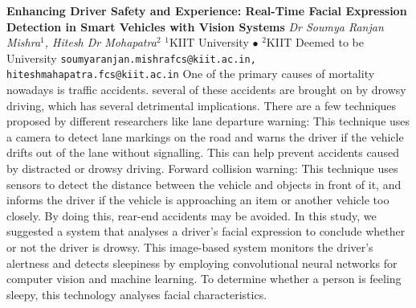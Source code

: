 
    \begin{conf-abstract}[]
        {\textbf{Enhancing Driver Safety and Experience: Real-Time Facial Expression Detection in Smart Vehicles with Vision Systems}}
        {\textit{Dr Soumya Ranjan Mishra$^{1}$, Hitesh Dr Mohapatra$^{2}$}}
        {$^{1}$KIIT University $\bullet$ $^{2}$KIIT Deemed to be University}
        {\texttt{soumyaranjan.mishrafcs@kiit.ac.in, hiteshmahapatra.fcs@kiit.ac.in}}
        {One of the primary causes of mortality nowadays is traffic accidents. several of these accidents are brought on by drowsy driving, which has several detrimental implications. There are a few techniques proposed by different researchers like lane departure warning: This technique uses a camera to detect lane markings on the road and warns the driver if the vehicle drifts out of the lane without signalling. This can help prevent accidents caused by distracted or drowsy driving. Forward collision warning: This technique uses sensors to detect the distance between the vehicle and objects in front of it, and informs the driver if the vehicle is approaching an item or another vehicle too closely. By doing this, rear-end accidents may be avoided. In this study, we suggested a system that analyses a driver's facial expression to conclude whether or not the driver is drowsy. This image-based system monitors the driver's alertness and detects sleepiness by employing convolutional neural networks for computer vision and machine learning. To determine whether a person is feeling sleepy, this technology analyses facial characteristics.}
    \end{conf-abstract}
        